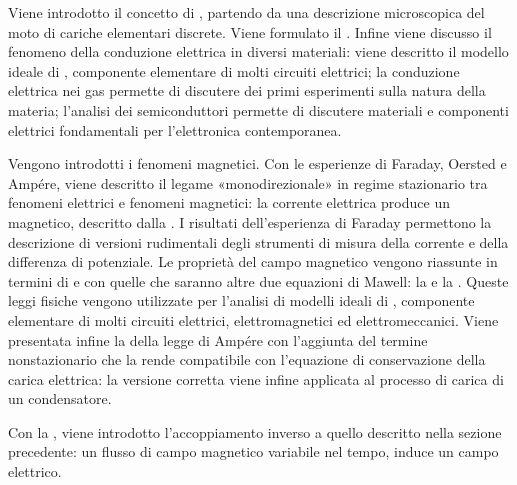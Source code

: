 \documentclass[letterpaper,10pt,italian]{jupyterBook}
\begin{document}
\sphinxAtStartPar
{\hyperref[\detokenize{ch/electromagnetism/electric-current:physics-hs-electromagnetism-electric-current}]{}} Viene introdotto il concetto di , partendo da una descrizione microscopica del moto di cariche elementari discrete. Viene formulato il . Infine viene discusso il fenomeno della conduzione elettrica in diversi materiali: viene descritto il modello ideale di , componente elementare di molti circuiti elettrici; la conduzione elettrica nei gas permette di discutere dei primi esperimenti sulla natura della materia; l’analisi dei semiconduttori permette di discutere materiali e componenti elettrici fondamentali per l’elettronica contemporanea.

\sphinxAtStartPar
{\hyperref[\detokenize{ch/electromagnetism/electromagnetism-steady:physics-hs-electromagnetism-electromagnetism-steady}]{}} Vengono introdotti i fenomeni magnetici. Con le esperienze di Faraday, Oersted e Ampére, viene descritto il legame «monodirezionale» in regime stazionario tra fenomeni elettrici e fenomeni magnetici: la corrente elettrica produce un magnetico, descritto dalla . I risultati dell’esperienza di Faraday permettono la descrizione di versioni rudimentali degli strumenti di misura della corrente e della differenza di potenziale. Le proprietà del campo magnetico vengono riassunte in termini di  e  con quelle che saranno altre due equazioni di Mawell: la  e la . Queste leggi fisiche vengono utilizzate per l’analisi di modelli ideali di , componente elementare di molti circuiti elettrici, elettromagnetici ed elettromeccanici. Viene presentata infine la  della legge di Ampére con l’aggiunta del termine non\sphinxhyphen{}stazionario che la rende compatibile con l’equazione di conservazione della carica elettrica: la versione corretta viene infine applicata al processo di carica di un condensatore.

\sphinxAtStartPar
{\hyperref[\detokenize{ch/electromagnetism/electromagnetism-general:physics-hs-electromagnetism-electromagnetism-general}]{}} Con la , viene introdotto l’accoppiamento inverso a quello descritto nella sezione precedente: un flusso di campo magnetico variabile nel tempo, induce un campo elettrico.
\end{document}
